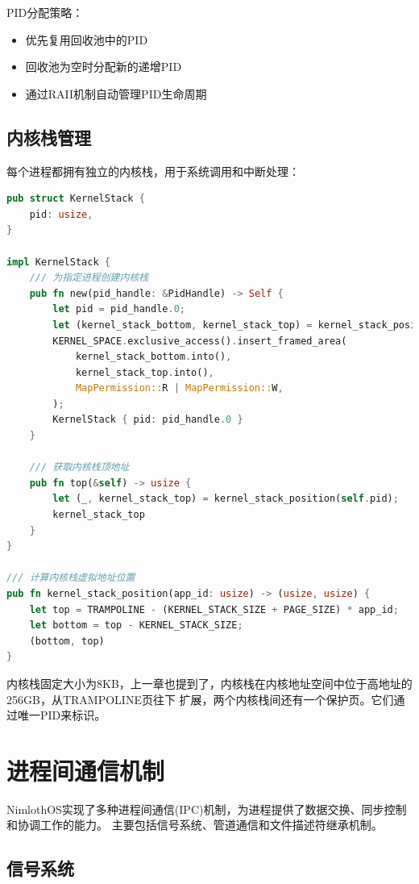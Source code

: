 PID分配策略：
\begin{itemize}
    \item 优先复用回收池中的PID
    \item 回收池为空时分配新的递增PID
    \item 通过RAII机制自动管理PID生命周期
\end{itemize}

\subsection{内核栈管理}

每个进程都拥有独立的内核栈，用于系统调用和中断处理：

\begin{lstlisting}[language=Rust,caption={内核栈实现}, label={lst:kernel-stack}]
pub struct KernelStack {
    pid: usize,
}

impl KernelStack {
    /// 为指定进程创建内核栈
    pub fn new(pid_handle: &PidHandle) -> Self {
        let pid = pid_handle.0;
        let (kernel_stack_bottom, kernel_stack_top) = kernel_stack_position(pid);
        KERNEL_SPACE.exclusive_access().insert_framed_area(
            kernel_stack_bottom.into(),
            kernel_stack_top.into(),
            MapPermission::R | MapPermission::W,
        );
        KernelStack { pid: pid_handle.0 }
    }

    /// 获取内核栈顶地址
    pub fn top(&self) -> usize {
        let (_, kernel_stack_top) = kernel_stack_position(self.pid);
        kernel_stack_top
    }
}

/// 计算内核栈虚拟地址位置
pub fn kernel_stack_position(app_id: usize) -> (usize, usize) {
    let top = TRAMPOLINE - (KERNEL_STACK_SIZE + PAGE_SIZE) * app_id;
    let bottom = top - KERNEL_STACK_SIZE;
    (bottom, top)
}
\end{lstlisting}

内核栈固定大小为8KB，上一章也提到了，内核栈在内核地址空间中位于高地址的256GB，从TRAMPOLINE页往下
扩展，两个内核栈间还有一个保护页。它们通过唯一PID来标识。

\section{进程间通信机制}

NimlothOS实现了多种进程间通信(IPC)机制，为进程提供了数据交换、同步控制和协调工作的能力。
主要包括信号系统、管道通信和文件描述符继承机制。

\subsection{信号系统}

